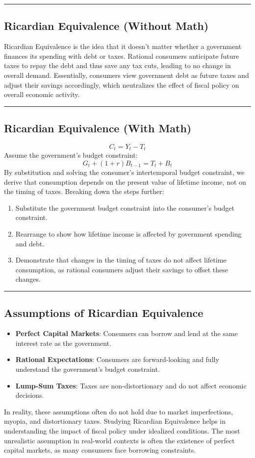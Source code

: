 \documentclass{article}
\begin{document}
\noindent\rule{\linewidth}{0.5pt}

\subsection{Ricardian Equivalence (Without Math)}
Ricardian Equivalence is the idea that it doesn't matter whether a government finances its spending with debt or taxes. Rational consumers anticipate future taxes to repay the debt and thus save any tax cuts, leading to no change in overall demand. Essentially, consumers view government debt as future taxes and adjust their savings accordingly, which neutralizes the effect of fiscal policy on overall economic activity.

\noindent\rule{\linewidth}{0.5pt}

\subsection{Ricardian Equivalence (With Math)}
\[
C_t = Y_t - T_t
\]
Assume the government's budget constraint:
\[
G_t + (1+r)B_{t-1} = T_t + B_t
\]
By substitution and solving the consumer's intertemporal budget constraint, we derive that consumption depends on the present value of lifetime income, not on the timing of taxes. Breaking down the steps further:
\begin{enumerate}
    \item Substitute the government budget constraint into the consumer's budget constraint.
    \item Rearrange to show how lifetime income is affected by government spending and debt.
    \item Demonstrate that changes in the timing of taxes do not affect lifetime consumption, as rational consumers adjust their savings to offset these changes.
\end{enumerate}

\noindent\rule{\linewidth}{0.5pt}

\subsection{Assumptions of Ricardian Equivalence}
\begin{itemize}
    \item \textbf{Perfect Capital Markets}: Consumers can borrow and lend at the same interest rate as the government.
    \item \textbf{Rational Expectations}: Consumers are forward-looking and fully understand the government's budget constraint.
    \item \textbf{Lump-Sum Taxes}: Taxes are non-distortionary and do not affect economic decisions.
\end{itemize}
In reality, these assumptions often do not hold due to market imperfections, myopia, and distortionary taxes. Studying Ricardian Equivalence helps in understanding the impact of fiscal policy under idealized conditions. The most unrealistic assumption in real-world contexts is often the existence of perfect capital markets, as many consumers face borrowing constraints.
\end{document}
